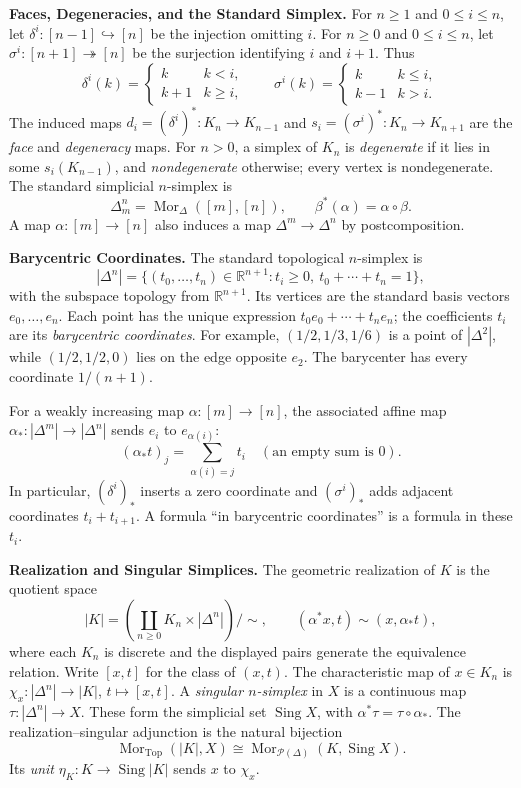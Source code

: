 \documentclass[11pt]{article}
\newcommand{\coursebold}[1]{{\color{burgundy}\textbf{#1}}}
\newcommand{\R}{\mathbb R}
\newcommand{\Top}{\mathrm{Top}}
\newcommand{\Sing}{\operatorname{Sing}}
\newcommand{\Mor}{\operatorname{Mor}}
\begin{document}
\coursebold{Faces, Degeneracies, and the Standard Simplex.}
For $n\geq1$ and $0\leq i\leq n$, let
$\delta^i:[n-1]\hookrightarrow[n]$ be the injection omitting $i$.
For $n\geq0$ and $0\leq i\leq n$, let
$\sigma^i:[n+1]\twoheadrightarrow[n]$ be the surjection identifying
$i$ and $i+1$. Thus
\[
\delta^i(k)=\begin{cases}k&k<i,\\k+1&k\geq i,\end{cases}
\qquad
\sigma^i(k)=\begin{cases}k&k\leq i,\\k-1&k>i.\end{cases}
\]
The induced maps $d_i=(\delta^i)^*:K_n\to K_{n-1}$ and
$s_i=(\sigma^i)^*:K_n\to K_{n+1}$ are the \emph{face} and
\emph{degeneracy} maps. For $n>0$, a simplex of $K_n$ is
\emph{degenerate} if it lies in some $s_i(K_{n-1})$, and
\emph{nondegenerate} otherwise; every vertex is nondegenerate.
The standard simplicial $n$-simplex is
\[
\Delta^n_m=\Mor_\Delta([m],[n]),\qquad
\beta^*(\alpha)=\alpha\circ\beta.
\]
A map $\alpha:[m]\to[n]$ also induces a map
$\Delta^m\to\Delta^n$ by postcomposition.


\coursebold{Barycentric Coordinates.}
The standard topological $n$-simplex is
\[
|\Delta^n|=\{(t_0,\ldots,t_n)\in\R^{n+1}:
 t_i\geq0,\ t_0+\cdots+t_n=1\},
\]
with the subspace topology from $\R^{n+1}$.
Its vertices are the standard basis vectors $e_0,\ldots,e_n$.
Each point has the unique expression $t_0e_0+\cdots+t_ne_n$;
the coefficients $t_i$ are its \emph{barycentric coordinates}.
For example,
$(1/2,1/3,1/6)$ is a point of $|\Delta^2|$, while $(1/2,1/2,0)$
lies on the edge opposite $e_2$. The barycenter has every coordinate
$1/(n+1)$.

For a weakly increasing map $\alpha:[m]\to[n]$, the associated affine map
$\alpha_*:|\Delta^m|\to|\Delta^n|$ sends $e_i$ to $e_{\alpha(i)}$:
\[
(\alpha_*t)_j=\sum_{\alpha(i)=j}t_i
\quad(\text{an empty sum is }0).
\]
In particular, $(\delta^i)_*$ inserts a zero coordinate and
$(\sigma^i)_*$ adds adjacent coordinates $t_i+t_{i+1}$.
A formula ``in barycentric coordinates'' is a formula in these $t_i$.

\coursebold{Realization and Singular Simplices.}
The geometric realization of $K$ is the quotient space
\[
|K|=\left(\coprod_{n\geq0}K_n\times|\Delta^n|\right)/\sim,
\qquad
(\alpha^*x,t)\sim(x,\alpha_*t),
\]
where each $K_n$ is discrete and the displayed pairs generate the
equivalence relation. Write $[x,t]$ for the class of $(x,t)$.
The characteristic map of $x\in K_n$ is
$\chi_x:|\Delta^n|\to|K|$, $t\mapsto[x,t]$.
A \emph{singular $n$-simplex} in $X$ is a continuous map
$\tau:|\Delta^n|\to X$. These form the simplicial set $\Sing X$,
with $\alpha^*\tau=\tau\circ\alpha_*$.
The realization--singular adjunction is the natural bijection
\[
\Mor_\Top(|K|,X)\cong\Mor_{\mathcal P(\Delta)}(K,\Sing X).
\]
Its \emph{unit} $\eta_K:K\to\Sing|K|$ sends $x$ to $\chi_x$.
\end{document}
